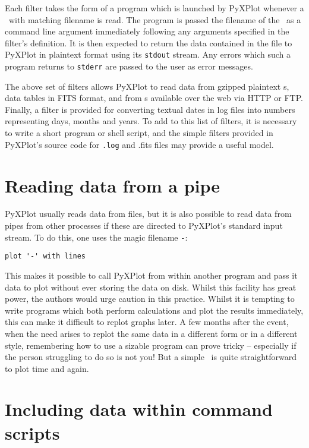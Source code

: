 Each filter takes the form of a program which is launched by PyXPlot whenever a
\datafile\ with matching filename is read. The program is passed the filename of
the \datafile\ as a command line argument immediately following any arguments
specified in the filter's definition. It is then expected to return the data
contained in the file to PyXPlot in plaintext format using its {\tt stdout}
stream. Any errors which such a program returns to {\tt stderr} are passed to
the user as error messages.

The above set of filters allows PyXPlot to read data from gzipped plaintext
\datafile s, data tables in FITS format, and from \datafile
s available over the web via HTTP or FTP. Finally, a
filter is provided for converting textual dates in log files into numbers
representing days, months and years. To add to this list of filters, it is
necessary to write a short program or shell script, and the simple filters
provided in PyXPlot's source code for {\tt .log} and {.fits} files may provide
a useful model.

\section{Reading data from a pipe}

PyXPlot usually reads data from files, but it is also possible to read data
from pipes from other processes if these are directed to PyXPlot's standard
input stream.  To do this, one uses the magic filename {\tt -}:

\begin{verbatim}
plot '-' with lines
\end{verbatim}

This makes it possible to call PyXPlot from within another program and pass it
data to plot without ever storing the data on disk. Whilst this facility has
great power, the authors would urge caution in this practice.  Whilst it is
tempting to write programs which both perform calculations and plot the results
immediately, this can make it difficult to replot graphs later. A few months
after the event, when the need arises to replot the same data in a different
form or in a different style, remembering how to use a sizable program can
prove tricky -- especially if the person struggling to do so is not you! But a
simple \datafile\ is quite straightforward to plot time and again.

\section{Including data within command scripts}

